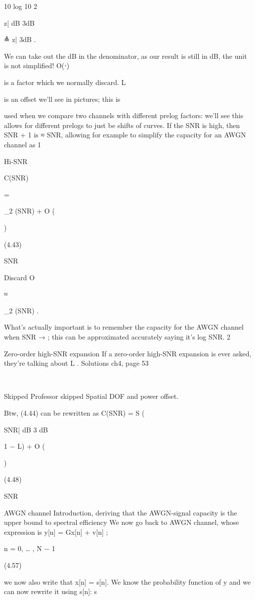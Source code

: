 {{{{{10 log 10 2

z| dB 3dB

≜ z| 3dB .

We can take out the dB in the denominator, as our result is still in dB, the unit is not simplified!
O(⋅)

is a factor which we normally discard. L

is an offset we'll see in pictures; this is

\infty

used when we compare two channels with different prelog factors: we'll see this allows for different prelogs to just be shifts of curves.
If the SNR is high, then SNR + 1 is ≈ SNR, allowing for example to simplify the capacity for an AWGN channel as 1

Hi-SNR

C(SNR)

=

\log_2 (SNR) + O (

)

(4.43)

SNR

Discard O

≈

\log_2 (SNR) .

What's actually important is to remember the capacity for the AWGN channel when SNR → \infty; this can be approximated accurately saying it's log SNR.
2

​Zero-order high-SNR expansion If a zero-order high-SNR expansion is ever asked, they're talking about L .
Solutions ch4, page 53

🔖

\infty

Skipped Professor skipped Spatial DOF and power offset.

Btw, (4.44) can be rewritten as C(SNR) = S \infty (

SNR| dB 3 dB

1
− L\infty ) + O (

)

(4.48)

SNR

AWGN channel Introduction, deriving that the AWGN-signal capacity is the upper bound to spectral efficiency We now go back to AWGN channel, whose expression is y[n] = \sqrt Gx[n] + v[n] ;

n = 0, … , N − 1

(4.57)

we now also write that x[n] = \sqrtE s[n]. We know the probability function of y and we can now rewrite it using s[n]:
s

}}}}}
